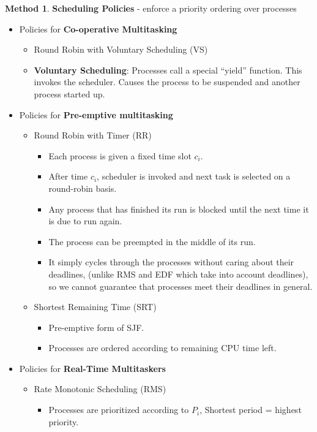 \documentclass[12pt,a4paper]{article}
\theoremstyle{definition}
\newtheorem{method}{Method}[section]
\newenvironment{myitemize}
{ \begin{itemize}
    \setlength{\itemsep}{5pt}
    \setlength{\parskip}{0pt}
    \setlength{\parsep}{0pt}     }
{ \end{itemize}                  }
\begin{document}
\begin{method}{\textbf{Scheduling Policies} - enforce a priority ordering over processes}
\begin{myitemize}
\begin{myitemize}
\begin{myitemize}
				\item Potential for starvation.
			\end{myitemize}
		\end{myitemize}
		\item Policies for \textbf{Co-operative Multitasking}
		\begin{myitemize}
			\item Round Robin with Voluntary Scheduling (\textsf{VS})
			\item \textbf{Voluntary Scheduling}: Processes call a special “yield” function. This invokes the scheduler. Causes the process to be suspended and another process started up.
		\end{myitemize}
		\item Policies for \textbf{Pre-emptive multitasking}
		\begin{myitemize}
			\item Round Robin with Timer (\textsf{RR})
			\begin{myitemize}
				\item Each process is given a fixed time slot $c_i$.
				\item After time $c_i$, scheduler is invoked and next task is selected on a round-robin basis.
				\item Any process that has finished its run is blocked until the next time it is due to run again.
				\item The process can be preempted in the middle of its run.
				\item It simply cycles through the processes without caring about their deadlines, (unlike RMS and EDF which take into account deadlines), so we cannot guarantee that processes meet their deadlines in general.
			\end{myitemize}
			\item Shortest Remaining Time (\textsf{SRT})
			\begin{myitemize}
				\item Pre-emptive form of SJF.
				\item Processes are ordered according to remaining CPU time left.
			\end{myitemize}
		\end{myitemize}
		\item Policies for \textbf{Real-Time Multitaskers}
		\begin{myitemize}
			\item Rate Monotonic Scheduling (\textsf{RMS})
			\begin{myitemize}
				\item Processes are prioritized according to $P_i$, Shortest period = highest priority.

\end{myitemize}
\end{myitemize}
\end{myitemize}
\end{method}
\end{document}
